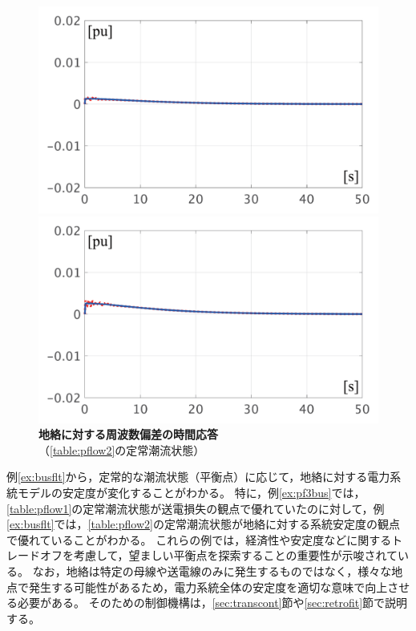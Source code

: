 \documentclass[tombow,dvipdfmx]{corona-a5-1.1}
\begin{document}
\begin{figure}[t]
  \centering
  {
  \begin{minipage}{0.49\linewidth}
    \centering
    \includegraphics[width = 1.0\linewidth]{figs/50mP3}
  \end{minipage}
  \begin{minipage}{0.49\linewidth}
    \centering
    \includegraphics[width = 1.0\linewidth]{figs/100mP3}
  \end{minipage}
  \medskip
  \caption{\textbf{地絡に対する周波数偏差の時間応答}
  \\ \centering （\ref{table:pflow2}の定常潮流状態）}
  \label{fig:P3fault}
  }
\medskip
\end{figure}

例\ref{ex:busflt}から，定常的な潮流状態（平衡点）に応じて，地絡に対する電力系統モデルの安定度が変化することがわかる。
特に，例\ref{ex:pf3bus}では，\ref{table:pflow1}の定常潮流状態が送電損失の観点で優れていたのに対して，例\ref{ex:busflt}では，\ref{table:pflow2}の定常潮流状態が地絡に対する系統安定度の観点で優れていることがわかる。
これらの例では，経済性や安定度などに関するトレードオフを考慮して，望ましい平衡点を探索することの重要性が示唆されている。
なお，地絡は特定の母線や送電線のみに発生するものではなく，様々な地点で発生する可能性があるため，電力系統全体の安定度を適切な意味で向上させる必要がある。
そのための制御機構は，\ref{sec:transcont}節や\ref{sec:retrofit}節で説明する。
\end{document}

